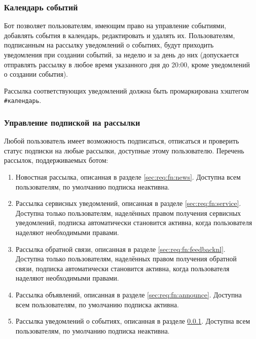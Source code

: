 \subsubsection{Календарь событий}
    \label{sec:req:fn:calendar}
    Бот позволяет пользователям, имеющим право на управление событиями, добавлять события в календарь,
    редактировать и удалять их. Пользователям, подписанным на рассылку уведомлений о событиях,
    будут приходить уведомления при создании событий, за неделю и за день до них (допускается отправлять
    рассылку в любое время указанного дня до 20:00, кроме уведомлений о создании события).

    Рассылка соответствующих уведомлений должна быть промаркирована хэштегом \hbox{\texttt{\#календарь}}.

\subsubsection{Управление подпиской на рассылки}
    \label{sec:req:fn:subscriptions}
    Любой пользователь имеет возможность подписаться, отписаться и проверить статус подписки на
    любые рассылки, доступные этому пользователю. Перечень рассылок, поддерживаемых ботом:
    \begin{enumerate}
        \item
            Новостная рассылка, описанная в разделе \ref{sec:req:fn:news}.
            Доступна всем пользователям, по умолчанию подписка неактивна.
        \item
            Рассылка сервисных уведомлений, описанная в разделе \ref{sec:req:fn:service}.
            Доступна только пользователям, наделённых правом получения сервисных уведомлений,
            подписка автоматически становится активна, когда пользователя
            наделяют необходимыми правами.
        \item
            Рассылка обратной связи, описанная в разделе \ref{sec:req:fn:feedbacknl}.
            Доступна только пользователям, наделённых правом получения обратной связи,
            подписка автоматически становится активна, когда пользователя
            наделяют необходимыми правами.
        \item
            Рассылка объявлений, описанная в разделе \ref{sec:req:fn:announce}.
            Доступна всем пользователям, по умолчанию подписка активна.
        \item
            Рассылка уведомлений о событиях, описанная в разделе \ref{sec:req:fn:calendar}.
            Доступна всем пользователям, по умолчанию подписка неактивна.
    \end{enumerate}

